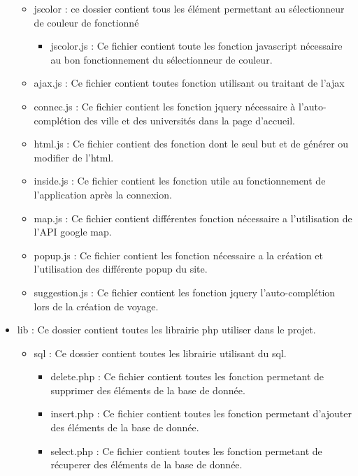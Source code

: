 \documentclass[a4paper,10pt]{report}
\begin{document}
\begin{itemize}
    \begin{itemize}
        \item jscolor : ce dossier contient tous les \'el\'ement permettant au s\'electionneur de couleur de fonctionn\'e
        \begin{itemize}
            \item jscolor.js : Ce fichier contient toute les fonction javascript n\'ecessaire au bon fonctionnement du s\'electionneur de couleur.
        \end{itemize}
        \item ajax.js : Ce fichier contient toutes fonction utilisant ou traitant de l'ajax
        \item connec.js : Ce fichier contient les fonction jquery n\'ecessaire à l'auto-compl\'etion des ville et des universit\'es dans la page d'accueil.
        \item html.js : Ce fichier contient des fonction dont le seul but et de g\'en\'erer ou modifier de l'html.
        \item inside.js : Ce fichier contient les fonction utile au fonctionnement de l'application apr\`es la connexion.
        \item map.js : Ce fichier contient diff\'erentes fonction n\'ecessaire a l'utilisation de l'API google map.
        \item popup.js : Ce fichier contient les fonction n\'ecessaire a la cr\'eation et l'utilisation des diff\'erente popup du site.
        \item suggestion.js : Ce fichier contient les fonction jquery l'auto-compl\'etion lors de la cr\'eation de voyage.
    \end{itemize}
    \item lib : Ce dossier contient toutes les librairie php utiliser dans le projet.
    \begin{itemize}
        \item sql : Ce dossier contient toutes les librairie utilisant du sql.
        \begin{itemize}
            \item delete.php : Ce fichier contient toutes les fonction permetant de supprimer des \'el\'ements de la base de donn\'ee.
            \item insert.php : Ce fichier contient toutes les fonction permetant d'ajouter des \'el\'ements de la base de donn\'ee.
            \item select.php : Ce fichier contient toutes les fonction permetant de r\'ecuperer des \'el\'ements de la base de donn\'ee.

\end{itemize}
\end{itemize}
\end{itemize}
\end{document}
